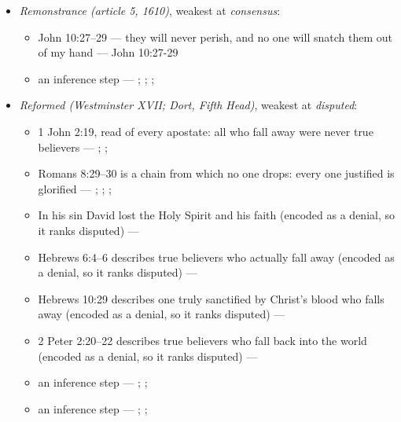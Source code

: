 \documentclass[11pt]{article}
\begin{document}
\begin{itemize}
\item \emph{Remonstrance (article 5, 1610)}, weakest at \emph{consensus}:
\begin{itemize}
\item John 10:27–29 — they will never perish, and no one will snatch them out of my hand --- John 10:27-29
\item an inference step --- \cite[548--549]{schaff-creeds-christendom-3-1977}; \cite[603]{arminius-works-1-1825}; \cite[Solid Declaration XI.45]{concordia-triglotta-1921}; \cite[444--445]{wesley-works-9-1827}
\end{itemize}
\item \emph{Reformed (Westminster XVII; Dort, Fifth Head)}, weakest at \emph{disputed}:
\begin{itemize}
\item 1 John 2:19, read of every apostate: all who fall away were never true believers --- \cite[594--595]{owen-works-11-perseverance}; \cite[191--192]{calvin-commentaries-catholic-epistles}; \cite[479--480]{npnf1-05-1887}
\item Romans 8:29–30 is a chain from which no one drops: every one justified is glorified --- \cite[582--583]{schaff-creeds-christendom-3-1977}; \cite[557]{schaff-creeds-christendom-3-1977}; \cite[384]{wesley-explanatory-notes-nt}; \cite[413]{wesley-works-9-1827}
\item In his sin David lost the Holy Spirit and his faith (encoded as a denial, so it ranks disputed) --- \cite[299--300]{calvin-psalms-2-1846}
\item Hebrews 6:4–6 describes true believers who actually fall away (encoded as a denial, so it ranks disputed) --- \cite[137--138]{calvin-hebrews-1853}
\item Hebrews 10:29 describes one truly sanctified by Christ’s blood who falls away (encoded as a denial, so it ranks disputed) --- \cite[545--546]{owen-works-23-1855}
\item 2 Peter 2:20–22 describes true believers who fall back into the world (encoded as a denial, so it ranks disputed) --- \cite[410--412]{calvin-commentaries-catholic-epistles}
\item an inference step --- \cite[444--445]{wesley-works-9-1827}; \cite[415--416]{calvin-commentary-john-1847}; \cite[Solid Declaration XI.45]{concordia-triglotta-1921}
\item an inference step --- \cite[Trent, Session VI (1547), ch. 13]{tanner-decrees-1990}; \cite[40]{waterworth-trent-1848}; \cite[Solid Declaration XI.42]{concordia-triglotta-1921}

\end{itemize}
\end{itemize}
\end{document}
